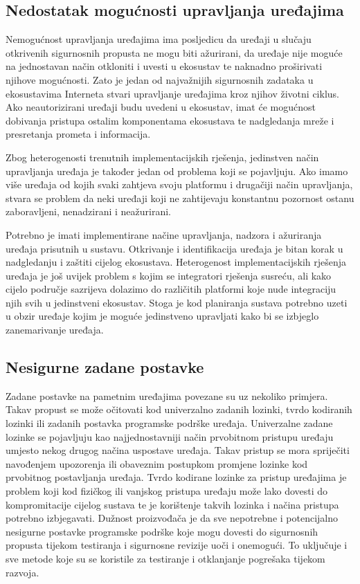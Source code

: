 \documentclass[times, utf8, diplomski]{fer}
\begin{document}
\subsection{Nedostatak mogućnosti upravljanja uređajima}
Nemogućnost upravljanja uređajima ima posljedicu da uređaji u slučaju otkrivenih sigurnosnih propusta ne mogu biti ažurirani, da uređaje nije moguće na jednostavan način otkloniti i uvesti u ekosustav te naknadno proširivati njihove mogućnosti. Zato je jedan od najvažnijih sigurnosnih zadataka u ekosustavima Interneta stvari upravljanje uređajima kroz njihov životni ciklus. Ako neautorizirani uređaji budu uvedeni u ekosustav, imat će mogućnost dobivanja pristupa ostalim komponentama ekosustava te nadgledanja mreže i presretanja prometa i informacija. 

Zbog heterogenosti trenutnih implementacijskih rješenja, jedinstven način upravljanja uređaja je također jedan od problema koji se pojavljuju. Ako imamo više uređaja od kojih svaki zahtjeva svoju platformu i drugačiji način upravljanja, stvara se problem da neki uređaji koji ne zahtijevaju konstantnu pozornost ostanu zaboravljeni, nenadzirani i neažurirani. 

Potrebno je imati implementirane načine upravljanja, nadzora i ažuriranja uređaja prisutnih u sustavu. Otkrivanje i identifikacija uređaja je bitan korak u nadgledanju i zaštiti cijelog ekosustava. Heterogenost implementacijskih rješenja uređaja je još uvijek problem s kojim se integratori rješenja susreću, ali kako cijelo područje sazrijeva dolazimo do različitih platformi koje nude integraciju njih svih u jedinstveni ekosustav. Stoga je kod planiranja sustava potrebno uzeti u obzir uređaje kojim je moguće jedinstveno upravljati kako bi se izbjeglo zanemarivanje uređaja.

\subsection{Nesigurne zadane postavke}
Zadane postavke na pametnim uređajima povezane su uz nekoliko primjera. Takav propust se može očitovati kod univerzalno zadanih lozinki, tvrdo kodiranih lozinki ili zadanih postavka programske podrške uređaja. Univerzalne zadane lozinke se pojavljuju kao najjednostavniji način prvobitnom pristupu uređaju umjesto nekog drugog načina uspostave uređaja. Takav pristup se mora spriječiti navođenjem upozorenja ili obaveznim postupkom promjene lozinke kod prvobitnog postavljanja uređaja. Tvrdo kodirane lozinke za pristup uređajima je problem koji kod fizičkog ili vanjskog pristupa uređaju može lako dovesti do kompromitacije cijelog sustava te je korištenje takvih lozinka i načina pristupa potrebno izbjegavati. Dužnost proizvođača je da sve nepotrebne i potencijalno nesigurne postavke programske podrške koje mogu dovesti do sigurnosnih propusta tijekom testiranja i sigurnosne revizije uoči i onemogući. To uključuje i sve metode koje su se koristile za testiranje i otklanjanje pogrešaka tijekom razvoja.
\end{document}

